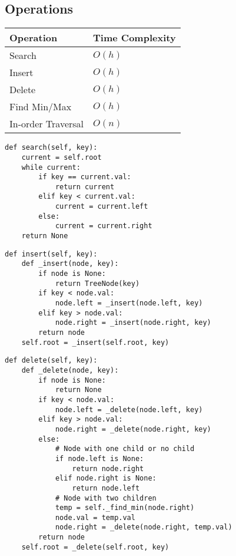 \newpage

\subsection{Operations}
\begin{summary}
    \begin{center}
        \begin{tabular}{ll}
            \toprule
            \textbf{Operation} & \textbf{Time Complexity} \\
            \midrule
            Search & $O(h)$ \\
            \midrule
            Insert & $O(h)$ \\
            \midrule
            Delete & $O(h)$ \\
            \midrule
            Find Min/Max & $O(h)$ \\
            \midrule
            In-order Traversal & $O(n)$ \\
        \end{tabular}
    \end{center}
\end{summary}

\begin{algo}
\begin{lstlisting}
def search(self, key):
    current = self.root
    while current:
        if key == current.val:
            return current
        elif key < current.val:
            current = current.left
        else:
            current = current.right
    return None
\end{lstlisting}
\end{algo}

\begin{algo}
\begin{lstlisting}
def insert(self, key):
    def _insert(node, key):
        if node is None:
            return TreeNode(key)
        if key < node.val:
            node.left = _insert(node.left, key)
        elif key > node.val:
            node.right = _insert(node.right, key)
        return node
    self.root = _insert(self.root, key)
\end{lstlisting}
\end{algo}

\begin{algo}
\begin{lstlisting}
def delete(self, key):
    def _delete(node, key):
        if node is None:
            return None
        if key < node.val:
            node.left = _delete(node.left, key)
        elif key > node.val:
            node.right = _delete(node.right, key)
        else:
            # Node with one child or no child
            if node.left is None:
                return node.right
            elif node.right is None:
                return node.left
            # Node with two children
            temp = self._find_min(node.right)
            node.val = temp.val
            node.right = _delete(node.right, temp.val)
        return node
    self.root = _delete(self.root, key)
\end{lstlisting}
\end{algo}
    
